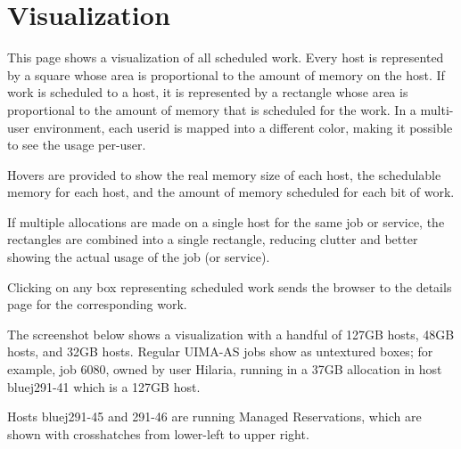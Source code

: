 % 
% 
% 
% 

    \section{Visualization}
    \label{sec:ws.vizualization}
       This page shows a visualization of all scheduled work.  Every host is represented by a square
       whose area is proportional to the amount of memory on the host.  If work is scheduled to a
       host, it is represented by a rectangle whose area is proportional to the amount of memory
       that is scheduled for the work.  In a multi-user environment, each userid is mapped into 
       a different color, making it possible to see the usage per-user.

       Hovers are provided to show the real memory size of each host, the schedulable memory for
       each host, and the amount of memory scheduled for each bit of work.

       If multiple allocations are made on a single host for the same job or service, the rectangles
       are combined into a single rectangle, reducing clutter and better showing the actual usage
       of the job (or service).   

       Clicking on any box representing scheduled work sends the browser to the details page for 
       the corresponding work.

       The screenshot below shows a visualization with a handful of 127GB hosts, 48GB hosts, and
       32GB hosts.  Regular UIMA-AS jobs show as untextured boxes; for example, job 6080, owned
       by user Hilaria, running in a 37GB allocation in host bluej291-41 which is a 127GB host.

       Hosts bluej291-45 and 291-46 are running Managed Reservations, which are shown with
       crosshatches from lower-left to upper right.

